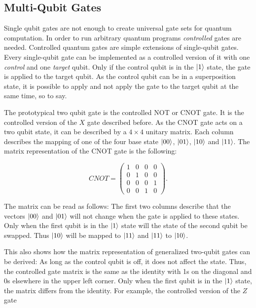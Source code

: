\subsection{Multi-Qubit Gates}

Single qubit gates are not enough to create universal gate sets for quantum
computation. In order to run arbitrary quantum programs 
 \textit{controlled} gates are needed.
Controlled quantum gates are simple extensions of single-qubit gates. Every single-qubit gate can be implemented as a controlled 
version of it with one \textit{control} and one \textit{target} qubit. Only if
the control qubit is in the $\Ket{1}$ state, the gate is applied to the target
qubit. As the control qubit can be in a superposition state, it is possible to apply and not apply the gate to the target qubit at the same time, so
to say.

The prototypical two qubit gate is the controlled NOT or CNOT gate. It is the controlled version of the 
$X$ gate described before. As the CNOT gate acts on a two qubit state, it can be described by 
a $4 \times 4$ unitary matrix. Each column describes the mapping of one of the four base
state $\Ket{00}$, $\Ket{01}$, $\Ket{10}$ and $\Ket{11}$. 
The matrix representation of the CNOT gate is the following:

\begin{equation}
  CNOT = \begin{pmatrix}
    1 & 0 & 0 & 0 \\
    0 & 1 & 0 & 0 \\
    0 & 0 & 0 & 1 \\
    0 & 0 & 1 & 0
    \end{pmatrix}.
\end{equation}

The matrix can be read as follows: The first two columns describe that the vectors $\Ket{00}$ and $\Ket{01}$ will not change when the gate is applied to these states. Only when the first qubit is in the $\Ket{1}$ state will the state of the second qubit be swapped. Thus $\Ket{10}$ will be mapped to $\Ket{11}$ and $\Ket{11}$ to $\Ket{10}$. 

This also shows how the matrix representation of generalized two-qubit gates can be derived: As long as the control qubit is off, it does not affect the state. Thus, the controlled gate matrix is the same as the identity with 1s on the diagonal and 0s elsewhere in the upper left corner. Only when the first qubit is in the $\Ket{1}$ state, the matrix differs from the identity. For example, the 
controlled version of the $Z$ gate

